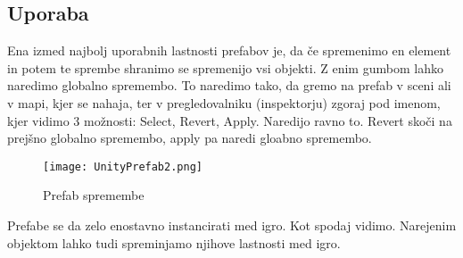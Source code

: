 {\color{indiagreen}\subsection{Uporaba}}
Ena izmed najbolj uporabnih lastnosti prefabov je, da če spremenimo en element in potem te sprembe shranimo se spremenijo vsi objekti. Z enim gumbom lahko naredimo globalno spremembo. To naredimo tako, da gremo na prefab v sceni ali v mapi, kjer se nahaja, ter v pregledovalniku (inspektorju) zgoraj pod imenom, kjer vidimo 3 možnosti: Select, Revert, Apply. Naredijo ravno to. Revert skoči na prejšno globalno spremembo, apply pa naredi gloabno spremembo.
\begin{figure}[ht!]
	\centering
	\texttt{[image: UnityPrefab2.png]}
	\caption{Prefab spremembe}
\end{figure}
Prefabe se da zelo enostavno instancirati med igro. Kot spodaj vidimo. Narejenim objektom lahko tudi spreminjamo njihove lastnosti med igro.
